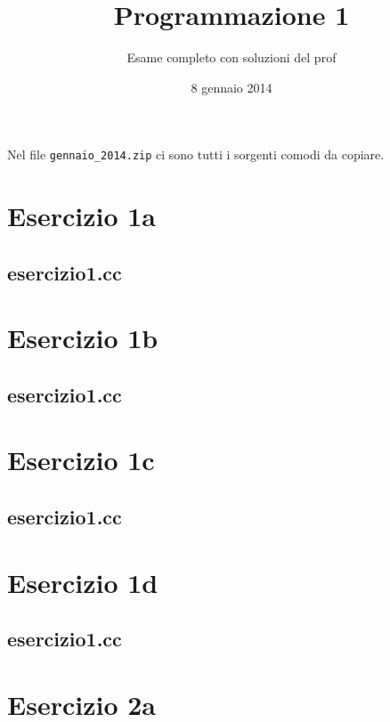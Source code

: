 \documentclass[fleqn,italian]{scrartcl}
\date{8 gennaio 2014}
\title{Programmazione 1}
\subtitle{Esame completo con soluzioni del prof}
\begin{document}
\maketitle
\begin{center}
Nel file {\tt gennaio\_2014.zip} ci sono tutti i sorgenti comodi da copiare.
\end{center}
\newpage

\section*{Esercizio 1a}

\newpage
\subsection*{{esercizio1.cc}}

\newpage

\section*{Esercizio 1b}

\newpage
\subsection*{{esercizio1.cc}}

\newpage

\section*{Esercizio 1c}

\newpage
\subsection*{{esercizio1.cc}}

\newpage

\section*{Esercizio 1d}

\newpage
\subsection*{{esercizio1.cc}}

\newpage

\section*{Esercizio 2a}

\newpage
\end{document}

